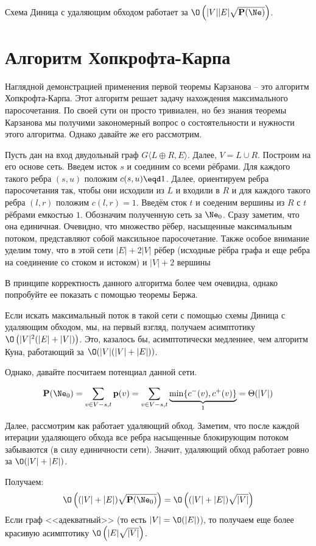 \Cons Схема Диница с удаляющим обходом работает за $\O\left( |V||E| \sqrt{\P(\Ne)} \right)$.

\section{Алгоритм Хопкрофта-Карпа}

Наглядной демонстрацией применения первой теоремы Карзанова -- это алгоритм Хопкрофта-Карпа. Этот алгоритм решает задачу нахождения максимального паросочетания.
По своей сути он просто тривиален, но без знания теоремы Карзанова мы получими закономерный вопрос о состоятельности и нужности этого алгоритма. Однако давайте же его рассмотрим.

Пусть дан на вход двудольный граф $G\langle L \oplus R, E \rangle$. Далее, $V = L \cup R$. Построим на его основе сеть. Введем исток $s$ и соединим со всеми рёбрами.
Для каждого такого ребра $(s, u)$ положим $c(s, u) \eqd 1$. Далее, ориентируем ребра паросочетания так, чтобы они исходили из $L$ и входили в $R$ и для каждого такого ребра $(l, r)$ положим $c(l, r) = 1$.
Введём сток $t$ и соеденим вершины из $R$ с $t$ рёбрами емкостью $1$. Обозначим полученную сеть за $\Ne_0$. Сразу заметим, что она единичная. Очевидно, что множество рёбер, насыщенные максимальным потоком, представляют собой максильное паросочетание.
Также особое внимание уделим тому, что в этой сети $|E| + 2 |V|$ рёбер (исходные рёбра графа и еще ребра на соединение со стоком и истоком) и $|V| + 2$ вершины

\Exe В принципе корректность данного алгоритма более чем очевидна, однако попробуйте ее показать с помощью теоремы Бержа.

Если искать максимальный поток в такой сети с помощью схемы Диница с удаляющим обходом, мы, на первый взгляд, получаем асимптотику $\O\left(|V|^2(|E| + |V|)\right)$. Это, казалось бы, асимптотически медленнее, чем алгоритм Куна, работающий за $\O(|V|(|V| + |E|))$.

Однако, давайте посчитаем потенциал данной сети.

\begin{equation*}
    \P(\Ne_0) = \sum\limits_{v \in V - s, t} \p(v) = \sum\limits_{v \in V - s, t} \underbrace{\min \{ c^-(v), c^+(v) \}}_{1} = \Theta(|V|)
\end{equation*}

Далее, рассмотрим как работает удаляющий обход. Заметим, что после каждой итерации удаляющего обхода все ребра насыщенные блокирующим потоком забываются (в силу единичности сети). Значит, удаляющий обход работает ровно за $\O(|V| + |E|)$.

Получаем:
\begin{equation*}
    \O\left( (|V| + |E|) \sqrt{\P(\Ne_0)} \right) = \O\left( (|V| + |E|) \sqrt{|V|} \right)
\end{equation*}
Если граф <<адекватный>> (то есть $|V| = \O(|E|)$), то получаем еще более красивую асимптотику $\O\left(|E| \sqrt{|V|}\right)$.

\endgroup
